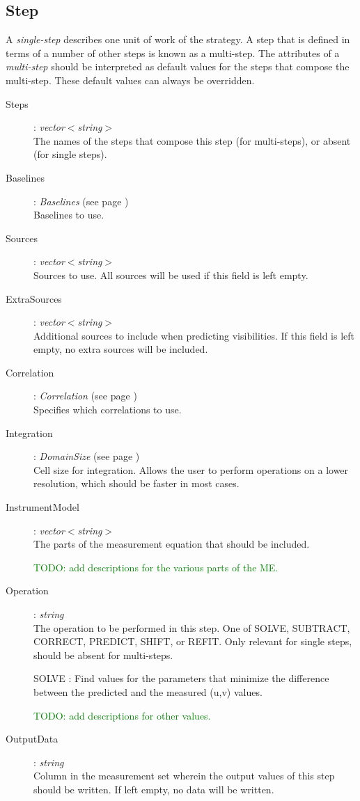 \documentclass[10pt]{lofar}
\begin{document}
\subsection*{Step}
A \emph{single-step} describes one unit of work of the strategy. A step that is
defined in terms of a number of other steps is known as a multi-step. The
attributes of a \emph{multi-step} should be interpreted as default values for
the steps that compose the multi-step. These default values can always be
overridden.
\begin{description}
\item [Steps] : \emph{vector$<$string$>$} \\
    The names of the steps that compose this step (for multi-steps), or absent
(for single steps).
\item [Baselines] : \emph{Baselines} (see page \pageref{app-baselines}) \\
    Baselines to use.
\item [Sources] : \emph{vector$<$string$>$} \\
    Sources to use. All sources will be used if this field is left empty.
\item [ExtraSources] : \emph{vector$<$string$>$} \\
    Additional sources to include when predicting visibilities. If this field is
left empty, no extra sources will be included.
\item [Correlation] : \emph{Correlation}  (see page \pageref{app-correlation})
\\
    Specifies which correlations to use.
\item [Integration] : \emph{DomainSize}  (see page \pageref{app-domainsize}) \\
    Cell size for integration. Allows the user to perform operations on a lower
resolution, which should be faster in most cases.
\item [InstrumentModel] : \emph{vector$<$string$>$} \\
    The parts of the measurement equation that should be included. \par
    \textcolor{green}{TODO: add descriptions for the various parts of the ME.}
\item [Operation] : \emph{string} \\
    The operation to be performed in this step. One of SOLVE, SUBTRACT, CORRECT,
PREDICT, SHIFT, or REFIT. Only relevant for single steps, should be absent for
multi-steps. \par
    SOLVE : Find values for the parameters that minimize the difference between
the predicted and the measured (u,v) values. \par
    \textcolor{green}{TODO: add descriptions for other values.}
\item [OutputData] : \emph{string} \\
    Column in the measurement set wherein the output values of this step should
be written. If left empty, no data will be written.
\end{description}
\end{document}
